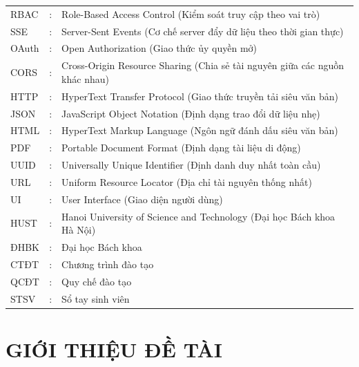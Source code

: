\documentclass[a4paper,13pt,3p,twoside]{report}
\theoremstyle{definition}
\begin{document}
\begin{tabular}{p{2.8cm} p{1.0cm} p{10.5cm}}
RBAC & : & Role-Based Access Control (Kiểm soát truy cập theo vai trò) \\[4pt]
SSE  & : & Server-Sent Events (Cơ chế server đẩy dữ liệu theo thời gian thực) \\[4pt]
OAuth & : & Open Authorization (Giao thức ủy quyền mở) \\[4pt]
CORS & : & Cross-Origin Resource Sharing (Chia sẻ tài nguyên giữa các nguồn khác nhau) \\[4pt]
HTTP & : & HyperText Transfer Protocol (Giao thức truyền tải siêu văn bản) \\[4pt]
JSON & : & JavaScript Object Notation (Định dạng trao đổi dữ liệu nhẹ) \\[4pt]
HTML & : & HyperText Markup Language (Ngôn ngữ đánh dấu siêu văn bản) \\[4pt]
PDF  & : & Portable Document Format (Định dạng tài liệu di động) \\[4pt]
UUID & : & Universally Unique Identifier (Định danh duy nhất toàn cầu) \\[4pt]
URL  & : & Uniform Resource Locator (Địa chỉ tài nguyên thống nhất) \\[4pt]
UI   & : & User Interface (Giao diện người dùng) \\[10pt]
HUST & : & Hanoi University of Science and Technology (Đại học Bách khoa Hà Nội) \\[4pt]
ĐHBK & : & Đại học Bách khoa \\[4pt]
CTĐT & : & Chương trình đào tạo \\[4pt]
QCĐT & : & Quy chế đào tạo \\[4pt]
STSV & : & Sổ tay sinh viên \\[4pt]
\end{tabular}

\cleardoublepage

\renewcommand\appendixname{PHỤ LỤC}
\renewcommand\appendixpagename{PHỤ LỤC}
\renewcommand\appendixtocname{PHỤ LỤC}


\newpage
{}

\pagestyle{fancy}
\fancyhf{}
\fancyhead[RE, LO]{\leftmark}
\fancyfoot[RE, LO]{\thepage}


\chapter{GIỚI THIỆU ĐỀ TÀI}

\end{document}
